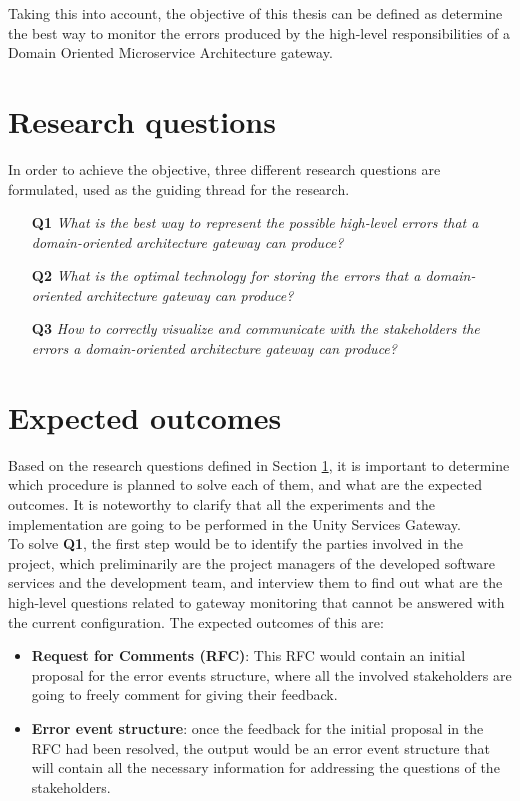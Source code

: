 \documentclass[12pt]{article}
\begin{document}
Taking this into account, the objective of this thesis can be defined as determine the best way to monitor the errors produced by the high-level responsibilities of a Domain Oriented Microservice Architecture gateway. \\

\section{Research questions}
\label{sec:research-questions}

In order to achieve the objective, three different research questions are formulated, used as the guiding thread for the research.

\begin{itemize}
    \item[\textbf{Q1}] \textit{What is the best way to represent the possible high-level errors that a domain-oriented architecture gateway can produce?}
    \item[\textbf{Q2}] \textit{What is the optimal technology for storing the errors that a domain-oriented architecture gateway can produce?}
    \item[\textbf{Q3}] \textit{How to correctly visualize and communicate with the stakeholders the errors a domain-oriented architecture gateway can produce?}
\end{itemize}

\section{Expected outcomes}

Based on the research questions defined in Section \ref{sec:research-questions}, it is important to determine which procedure is planned to solve each of them, and what are the expected outcomes. It is noteworthy to clarify that all the experiments and the implementation are going to be performed in the Unity Services Gateway.\\

To solve \textbf{Q1}, the first step would be to identify the parties involved in the project, which preliminarily are the project managers of the developed software services and the development team, and interview them to find out what are the high-level questions related to gateway monitoring that cannot be answered with the current configuration. The expected outcomes of this are:

\begin{itemize}
    \item \textbf{Request for Comments (RFC)}: This RFC would contain an initial proposal for the error events structure, where all the involved stakeholders are going to freely comment for giving their feedback.
    \item \textbf{Error event structure}: once the feedback for the initial proposal in the RFC had been resolved, the output would be an error event structure that will contain all the necessary information for addressing the questions of the stakeholders.
\end{itemize}
\end{document}
